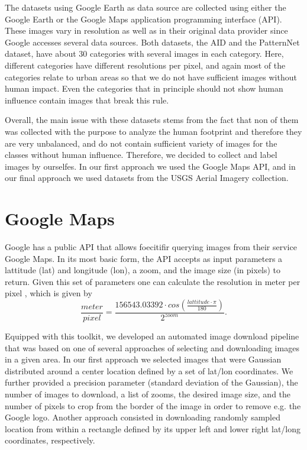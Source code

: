 The datasets using Google Earth as data source are collected using either the Google Earth or the Google Maps application programming interface (API). These images vary in resolution as well as in their original data provider since Google accesses several data sources. 
Both datasets, the AID and the PatternNet dataset, have about 30 categories with several images in each category. Here, different categories have different resolutions per pixel, and again most of the categories relate to urban areas so that we do not have sufficient images without human impact. Even the categories that in principle should not show human influence contain images that break this rule.

Overall, the main issue with these datasets stems from the fact that non of them was collected with the purpose to analyze the human footprint and therefore they are very unbalanced, and do not contain sufficient variety of images for the classes without human influence. Therefore, we decided to collect and label images by ourselfes. In our first approach we used the Google Maps API, and in our final approach we used datasets from the USGS Aerial Imagery collection.

\section{Google Maps}

Google has a public API that allows foecitifir querying images from their service Google Maps. In its most basic form, the API accepts as input parameters a lattitude (lat) and longitude (lon), a zoom, and the image size (in pixels) to return. Given this set of parameters one can calculate the resolution in meter per pixel \parencite{gmaps_res_per_m}, which is given by
\begin{equation}
\frac{meter}{pixel} = \frac{156543.03392 \cdot cos(\frac{lattitude \cdot \pi}{180})}{2 ^ {zoom}}.
\label{eq:gmaps_res_per_m}
\end{equation}

Equipped with this toolkit, we developed an automated image download pipeline that was based on one of several approaches of selecting and downloading images in a given area. In our first approach we selected images that were Gaussian distributed around a center location defined by a set of lat/lon coordinates. We further provided a precision parameter (standard deviation of the Gaussian), the number of images to download, a list of zooms, the desired image size, and the number of pixels to crop from the border of the image in order to remove e.g. the Google logo. Another approach consisted in downloading randomly sampled location from within a rectangle defined by its upper left and lower right lat/long coordinates, respectively.

